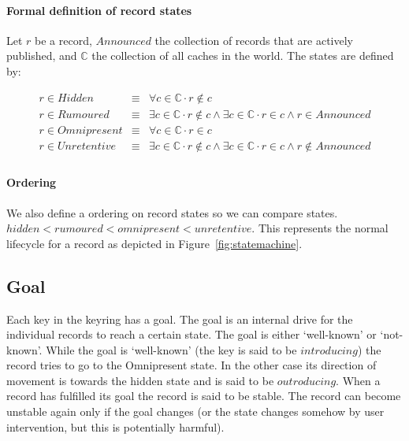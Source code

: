 \documentclass[twoside, a4paper]{article}
\begin{document}
\paragraph{Formal definition of record states} Let $r$ be a record, 
$Announced$ the collection of records that are actively published, 
and $\mathbb{C}$ the collection of all caches in the world. The 
states are defined by:

\begin{displaymath}
\begin{array}{lllll}
       r\in Hidden      & \equiv & \forall c \in \mathbb{C} \cdot r \not \in c \\
       r\in Rumoured    & \equiv & \exists c \in \mathbb{C} \cdot r \not \in c \wedge \exists c \in \mathbb{C} \cdot r\in c \wedge r\in Announced\\
       r\in Omnipresent & \equiv & \forall c \in \mathbb{C} \cdot r \in c \\
       r\in Unretentive & \equiv & \exists c \in \mathbb{C} \cdot r \not \in c \wedge \exists c \in \mathbb{C} \cdot r \in c \wedge r \notin Announced \\
\end{array}
\end{displaymath}

\paragraph{Ordering} We also define a ordering on record states so 
we can compare states. $ hidden < rumoured < omnipresent < 
unretentive$. This represents the normal lifecycle for a record as 
depicted in Figure~\ref{fig:statemachine}.


\subsection{Goal}

Each key in the keyring has a goal. The goal is an internal drive 
for the individual records to reach a certain state. The goal is 
either `well-known' or `not-known'. While the goal is 
`well-known' (the key is said to be $introducing$) the record tries to go to the Omnipresent state. In 
the other case its direction of movement is towards the hidden 
state and is said to be $outroducing$. When a record has fulfilled its goal the record is said to be 
stable. The record can become unstable again only if the goal changes (or
the state changes somehow by user intervention, but this is potentially harmful).
\end{document}
